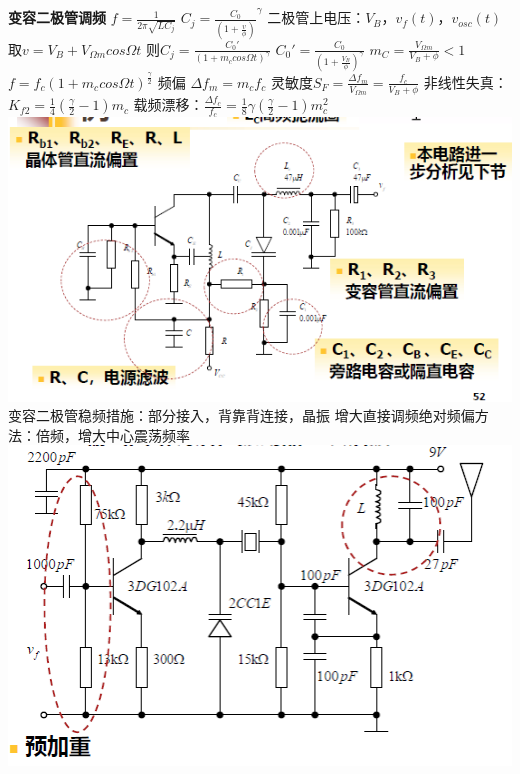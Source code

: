 \documentclass[10.5pt,landscape]{article}
\begin{document}
\begin{multicols*}{4}
  \textbf{变容二极管调频}\newline
  $f = \frac{1}{2\pi \sqrt{LC_j}}$ \newline
  $C_j = \frac{C_0}{(1 + \frac{v}{\phi})}^\gamma $ \newline
  二极管上电压：$V_B$，$v_f(t)$，$v_{osc}(t)$ \newline
  取$v = V_B + V_{\Omega m} cos\Omega t$ \newline
  则$C_j = \frac{C_0'}{(1 + m_c cos\Omega t)^\gamma}$ \newline
  $C_0' = \frac{C_0}{(1 + \frac{V_B}{\phi})^\gamma}$ \newline
  $m_C = \frac{V_{\Omega m}}{V_B + \phi} < 1$ \newline
  $f = f_c (1 + m_c cos\Omega t)^\frac{\gamma}{2}$ \newline
  频偏 $\Delta f_m = m_c f_c$ \newline
  灵敏度$S_F = \frac{\Delta f_m}{V_{\Omega m}} = \frac{f_c}{V_B + \phi}$ \newline
  非线性失真：$K_{f2} = \frac{1}{4}(\frac{\gamma}{2} - 1)m_c$ \newline
  载频漂移：$\frac{\Delta f_c}{f_c} = \frac{1}{8} \gamma (\frac{\gamma}{2} -1)m_c^2$ \newline
    \includegraphics[scale=0.4]{FMdirect}\newline
 变容二极管稳频措施：部分接入，背靠背连接，晶振\newline
  增大直接调频绝对频偏方法：倍频，增大中心震荡频率\newline
 \includegraphics[scale=0.5]{晶振}\newline

\end{multicols*}
\end{document}
